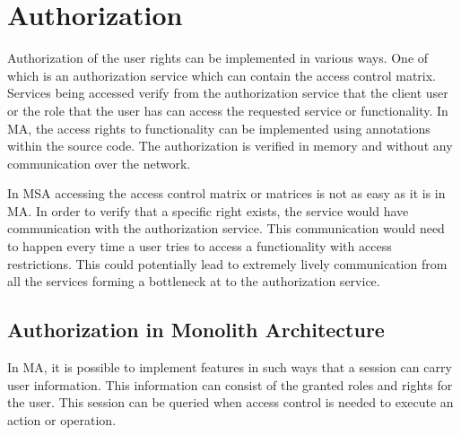 



\section{Authorization}
\begin{sloppypar}
    Authorization of the user rights can be implemented in various ways. One of 
    which is an authorization service which can contain the access control 
    matrix. Services being accessed verify from the authorization service that 
    the client user or the role that the user has can access the requested 
    service or functionality. In MA, the access rights to functionality can 
    be implemented using annotations within the source code. The authorization 
    is verified in memory and without any communication over the network. 
\end{sloppypar}
\begin{sloppypar}
    In MSA accessing the access control matrix or matrices is not as easy as it 
    is in MA. In order to verify that a specific right exists, the service would 
    have communication with the authorization service. This communication would 
    need to happen every time a user tries to access a functionality with 
    access restrictions. This could potentially lead to extremely lively 
    communication from all the services forming a bottleneck at to the 
    authorization service.
\end{sloppypar}

\subsection{Authorization in Monolith Architecture}
\begin{sloppypar}
    In MA, it is possible to implement features in such ways that a session can 
    carry user information. This information can consist of the granted roles 
    and rights for the user. This session can be queried when access control is 
    needed to execute an action or operation.
\end{sloppypar}


